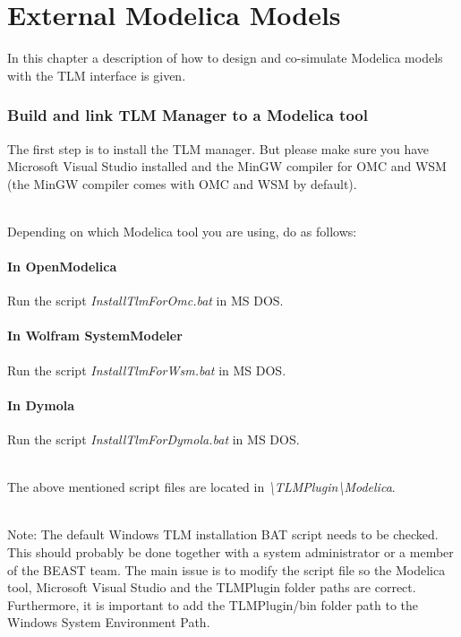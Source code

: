 \chapter{External Modelica Models}
\label{MMModelica}

In this chapter a description of how to design and co-simulate Modelica models with the TLM interface is given.

\subsection{Build and link TLM Manager to a Modelica tool}

The first step is to install the TLM manager. But please make sure you have Microsoft Visual Studio installed and the MinGW compiler for OMC and WSM (the MinGW compiler comes with OMC and WSM by default).

~\\Depending on which Modelica tool you are using, do as follows:

\subsubsection{In OpenModelica}
Run the script \textit{InstallTlmForOmc.bat} in MS DOS.

\subsubsection{In Wolfram SystemModeler}
Run the script \textit{InstallTlmForWsm.bat} in MS DOS.

\subsubsection{In Dymola}
Run the script \textit{InstallTlmForDymola.bat} in MS DOS.

~\\The above mentioned script files are located in \textit{\textbackslash TLMPlugin\textbackslash Modelica}.

~\\Note: The default Windows TLM installation BAT script needs to be checked.
This should probably be done together with a system administrator or a member of the BEAST team. The main issue is to modify the script file so the Modelica tool, Microsoft Visual Studio and the TLMPlugin folder paths are correct. Furthermore, it is important to add the TLMPlugin/bin folder path to the Windows System Environment Path.  

